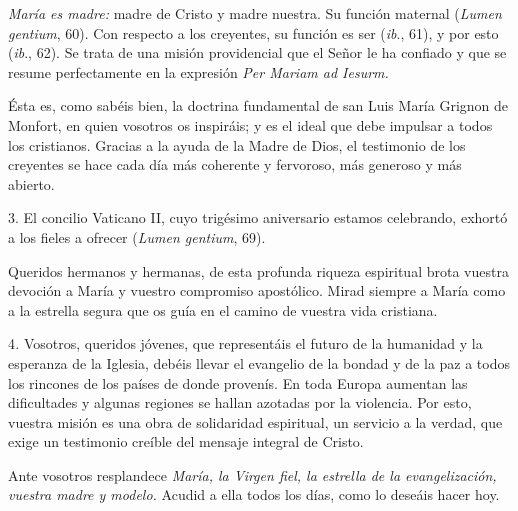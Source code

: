 \emph{María es madre:} madre de Cristo y madre nuestra. Su función maternal  (\emph{Lumen gentium}, 60). Con respecto a los creyentes, su función es ser  (\emph{ib}., \emph{} 61), y por esto  (\emph{ib}., 62). Se trata de una misión providencial que el Señor le ha confiado y que se resume perfectamente en la expresión \emph{Per Mariam ad Iesurm.}

Ésta es, como sabéis bien, la doctrina fundamental de san Luis María Grignon de Monfort, en quien vosotros os inspiráis; y es el ideal que debe impulsar a todos los cristianos. Gracias a la ayuda de la Madre de Dios, el testimonio de los creyentes se hace cada día más coherente y fervoroso, más generoso y más abierto.

3. El concilio Vaticano II, cuyo trigésimo aniversario estamos celebrando, exhortó a los fieles a ofrecer  (\emph{Lumen gentium}, 69).

Queridos hermanos y hermanas, de esta profunda riqueza espiritual brota vuestra devoción a María y vuestro compromiso apostólico. Mirad siempre a María como a la estrella segura que os guía en el camino de vuestra vida cristiana.

4\emph{.} Vosotros, queridos jóvenes, que representáis el futuro de la humanidad y la esperanza de la Iglesia, debéis llevar el evangelio de la bondad y de la paz a todos los rincones de los países de donde provenís. En toda Europa aumentan las dificultades y algunas regiones se hallan azotadas por la violencia. Por esto, vuestra misión es una obra de solidaridad espiritual, un servicio a la verdad, que exige un testimonio creíble del mensaje integral de Cristo.

Ante vosotros resplandece \emph{María, la Virgen fiel, la estrella de la evangelización, vuestra madre y modelo.} Acudid a ella todos los días, como lo deseáis hacer hoy.

